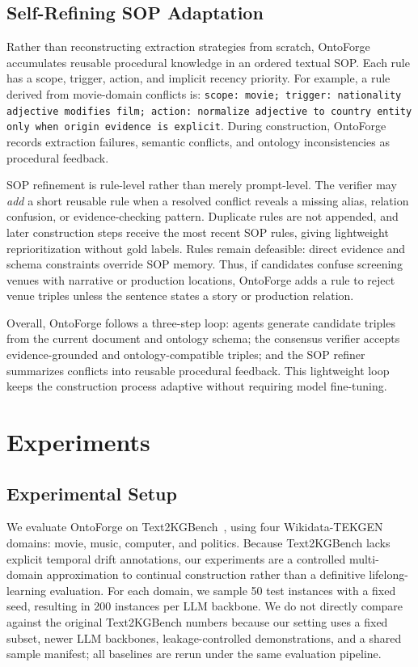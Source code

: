 \documentclass[sigconf]{acmart}
\begin{document}
\subsection{Self-Refining SOP Adaptation}

Rather than reconstructing extraction strategies from scratch, OntoForge accumulates reusable procedural knowledge in an ordered textual SOP. Each rule has a scope, trigger, action, and implicit recency priority. For example, a rule derived from movie-domain conflicts is: \texttt{scope: movie; trigger: nationality adjective modifies film; action: normalize adjective to country entity only when origin evidence is explicit}. During construction, OntoForge records extraction failures, semantic conflicts, and ontology inconsistencies as procedural feedback.

SOP refinement is rule-level rather than merely prompt-level. The verifier may \textit{add} a short reusable rule when a resolved conflict reveals a missing alias, relation confusion, or evidence-checking pattern. Duplicate rules are not appended, and later construction steps receive the most recent SOP rules, giving lightweight reprioritization without gold labels. Rules remain defeasible: direct evidence and schema constraints override SOP memory. Thus, if candidates confuse screening venues with narrative or production locations, OntoForge adds a rule to reject venue triples unless the sentence states a story or production relation.

Overall, OntoForge follows a three-step loop: agents generate candidate triples from the current document and ontology schema; the consensus verifier accepts evidence-grounded and ontology-compatible triples; and the SOP refiner summarizes conflicts into reusable procedural feedback. This lightweight loop keeps the construction process adaptive without requiring model fine-tuning.

\section{Experiments}
\label{sec:experiments}

\subsection{Experimental Setup}

We evaluate OntoForge on Text2KGBench~\cite{text2kgbench2023}, using four Wikidata-TEKGEN domains: movie, music, computer, and politics. Because Text2KGBench lacks explicit temporal drift annotations, our experiments are a controlled multi-domain approximation to continual construction rather than a definitive lifelong-learning evaluation. For each domain, we sample 50 test instances with a fixed seed, resulting in 200 instances per LLM backbone. We do not directly compare against the original Text2KGBench numbers because our setting uses a fixed subset, newer LLM backbones, leakage-controlled demonstrations, and a shared sample manifest; all baselines are rerun under the same evaluation pipeline.
\end{document}
